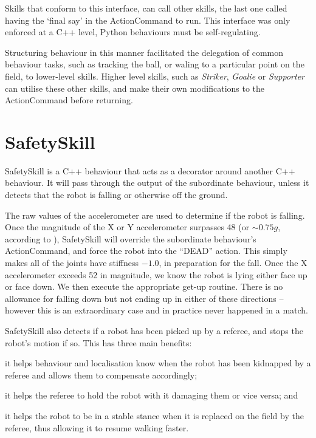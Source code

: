 \documentclass[pdftex,11pt,a4paper]{report}
\begin{document}
   Skills that conform to this interface, can call other skills, the last one called having the `final say' in the ActionCommand to run. This interface was only enforced at a C++ level, Python behaviours must be self-regulating.

   Structuring behaviour in this manner facilitated the delegation of common behaviour tasks, such as tracking the ball, or waling to a particular point on the field, to lower-level skills. Higher level skills, such as \emph{Striker}, \emph{Goalie} or \emph{Supporter} can utilise these other skills, and make their own modifications to the ActionCommand before returning.

\section{SafetySkill}
SafetySkill is a C++ behaviour that acts as a decorator around another C++
behaviour. It will pass through the output of the subordinate behaviour,
unless it detects that the robot is falling or otherwise off the ground.

The raw values of the accelerometer are used to determine if the robot is
falling. Once the magnitude of the X or Y accelerometer surpasses 48 (or
$\sim0.75g$, according to \cite{aldebaran10developer}), SafetySkill will
override the subordinate behaviour's ActionCommand, and force the robot
into the ``DEAD'' action. This simply makes all of the joints have
stiffness $-1.0$, in preparation for the fall.  Once the X accelerometer
exceeds 52 in magnitude, we know the robot is lying either face up or face
down. We then execute the appropriate get-up routine. There is no allowance
for falling down but not ending up in either of these directions -- however
this is an extraordinary case and in practice never happened in a match.

SafetySkill also detects if a robot has been picked up by a referee, and
stops the robot's motion if so. This has three main benefits: 
\begin{inparaenum}
\item it helps behaviour and localisation know when the robot has been
    kidnapped by a referee and allows them to compensate accordingly;
\item it helps the referee to hold the robot with it damaging them or vice
    versa; and
\item it helps the robot to be in a stable stance when it is replaced on
    the field by the referee, thus allowing it to resume walking faster.
\end{inparaenum}
\end{document}
